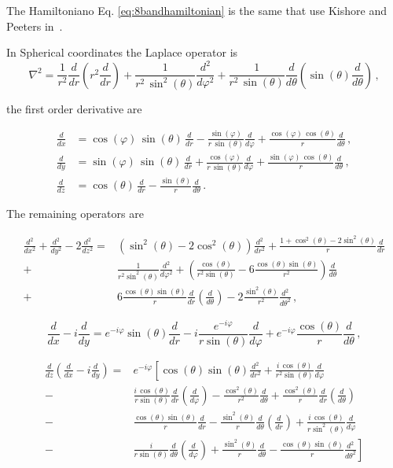 \documentclass[12pt,a4paper]{article}
\newcommand{\dx}[1]{\frac{d{#1}}{dx}}
\newcommand{\dy}[1]{\frac{d{#1}}{dy}}
\newcommand{\dz}[1]{\frac{d{#1}}{dz}}
\newcommand{\ddx}[1]{\frac{d^2{#1}}{dx^2}}
\newcommand{\ddy}[1]{\frac{d^2{#1}}{dy^2}}
\newcommand{\ddz}[1]{\frac{d^2{#1}}{dz^2}}
\newcommand{\dr}[1]{\frac{d{#1}}{dr}}
\newcommand{\ddr}[1]{\frac{d^2{#1}}{dr^2}}
\newcommand{\dphi}[1]{\frac{d{#1}}{d\varphi}}
\newcommand{\ddphi}[1]{\frac{d^2{#1}}{d\varphi^2}}
\newcommand{\dt}[1]{\frac{d{#1}}{d\theta}}
\newcommand{\ddt}[1]{\frac{d^2{#1}}{d\theta^2}}
\newcommand{\cphi}{\cos(\varphi)}
\newcommand{\sphi}{\sin(\varphi)}
\newcommand{\ct}{\cos(\theta)}
\newcommand{\cct}{\cos^2(\theta)}
\newcommand{\st}{\sin(\theta)}
\newcommand{\sst}{\sin^2(\theta)}
\begin{document}
The Hamiltoniano Eq. \ref{eq:8bandhamiltonian} is the same that use Kishore and Peeters in~\cite{kishore2014electronic}.

In Spherical coordinates the Laplace operator is
\begin{equation}
\nabla^2 = \frac{1}{r^2}\frac{d}{dr}\left(r^2\frac{d}{dr}\right) + \frac{1}{r^2\,\sin^2(\theta)}\frac{d^2}{d\varphi^2}
           + \frac{1}{r^2\,\sin(\theta)}\frac{d}{d\theta}\left(\sin(\theta)\frac{d}{d\theta}\right)\,,
\end{equation}

\noindent
the first order derivative are

\begin{equation}\label{eq:der}
\begin{split}
\dx{} &= \cphi\,\st\,\dr{} - \frac{\sphi}{r\,\st}\dphi{} + \frac{\cphi\,\ct}{r}\dt{}\,, \\
\dy{} &= \sphi\,\st\,\dr{} + \frac{\cphi}{r\,\st}\dphi{} + \frac{\sphi\,\ct}{r}\dt{}\,, \\
\dz{} &= \ct\,\dr{} - \frac{\st}{r} \dt{}\,.
\end{split}
\end{equation}

\noindent
The remaining operators are

\begin{equation}
\begin{split}
\ddx{} + \ddy{} - 2\ddz{} =& \left(\sst - 2\cct\right) \ddr{} + \frac{1 + \cct - 2\sst}{r}\dr{}{} \\
                    +& \frac{1}{r^2\sst}\ddphi{} + \left(\frac{\ct}{r^2\st} - 6\frac{\ct\st}{r^2}\right)\dt{} \\
                    +& 6\frac{\ct\st}{r}\dr{}{}\left(\dt{}\right) - 2\frac{\sst}{r^2}\ddt{}\,,
\end{split}
\end{equation}

\begin{equation}
\dx{} - i\dy{} = e^{-i\varphi}\st\dr{} - i\frac{e^{-i\varphi}}{r\st}\dphi{} + e^{-i\varphi}\frac{\ct}{r}\dt{}\,,
\end{equation}

\begin{equation}
\begin{split}
\dz{}\left(\dx{} - i\dy{}\right) =& e^{-i\varphi}\left[\ct\st\ddr{} + \frac{i\,\ct}{r^2\st}\dphi{} \right. \\
                           -& \frac{i\,\ct}{r\st}\dr{}\left(\dphi{}\right) - \frac{\cct}{r^2}\dt{} + \frac{\cct}{r}\dr{}\left(\dt{}\right) \\
                           -& \frac{\ct\st}{r}\dr{} - \frac{\sst}{r}\dt{}\left(\dr{}\right) + \frac{i\,\ct}{r\sst}\dphi{} \\
                           -& \left.\frac{i}{r\st}\dt{}\left(\dphi{}\right) + \frac{\sst}{r}\dt{} - \frac{\ct\st}{r}\ddt{} \right]
\end{split}
\end{equation}
\end{document}
